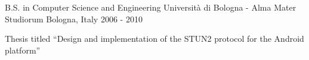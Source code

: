 

\begin{cventries}

  \cventry
    {B.S. in Computer Science and Engineering} %
    {Università di Bologna - Alma Mater Studiorum} %
    {Bologna, Italy} %
    {2006 - 2010} %
    {
      \begin{cvitems} %
        \item {Thesis titled ``Design and implementation of the STUN2 protocol for the Android platform''}
      \end{cvitems}
    }

\end{cventries}
